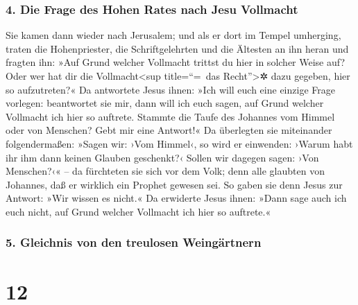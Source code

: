 \hypertarget{die-frage-des-hohen-rates-nach-jesu-vollmacht}{%
\subsubsection{4. Die Frage des Hohen Rates nach Jesu
Vollmacht}\label{die-frage-des-hohen-rates-nach-jesu-vollmacht}}

 Sie kamen dann wieder nach Jerusalem; und als er dort im
Tempel umherging, traten die Hohenpriester, die Schriftgelehrten und die
Ältesten an ihn heran  und fragten ihn: »Auf Grund
welcher Vollmacht trittst du hier in solcher Weise auf? Oder wer hat dir
die Vollmacht\textless sup title=``=~das Recht''\textgreater✲ dazu
gegeben, hier so aufzutreten?«  Da antwortete Jesus
ihnen: »Ich will euch eine einzige Frage vorlegen: beantwortet sie mir,
dann will ich euch sagen, auf Grund welcher Vollmacht ich hier so
auftrete.  Stammte die Taufe des Johannes vom Himmel oder
von Menschen? Gebt mir eine Antwort!«  Da überlegten sie
miteinander folgendermaßen: »Sagen wir: ›Vom Himmel‹, so wird er
einwenden: ›Warum habt ihr ihm dann keinen Glauben geschenkt?‹
 Sollen wir dagegen sagen: ›Von Menschen?‹« -- da
fürchteten sie sich vor dem Volk; denn alle glaubten von Johannes, daß
er wirklich ein Prophet gewesen sei.  So gaben sie denn
Jesus zur Antwort: »Wir wissen es nicht.« Da erwiderte Jesus ihnen:
»Dann sage auch ich euch nicht, auf Grund welcher Vollmacht ich hier so
auftrete.«

\hypertarget{gleichnis-von-den-treulosen-weinguxe4rtnern}{%
\subsubsection{5. Gleichnis von den treulosen
Weingärtnern}\label{gleichnis-von-den-treulosen-weinguxe4rtnern}}

\hypertarget{section-11}{%
\section{12}\label{section-11}}

